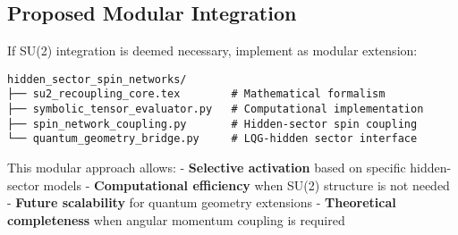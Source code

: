 \documentclass[12pt]{article}
\begin{document}
\subsection{Proposed Modular Integration}

If SU(2) integration is deemed necessary, implement as modular extension:

\begin{verbatim}
hidden_sector_spin_networks/
├── su2_recoupling_core.tex        # Mathematical formalism
├── symbolic_tensor_evaluator.py   # Computational implementation  
├── spin_network_coupling.py       # Hidden-sector spin coupling
└── quantum_geometry_bridge.py     # LQG-hidden sector interface
\end{verbatim}

This modular approach allows:
- \textbf{Selective activation} based on specific hidden-sector models
- \textbf{Computational efficiency} when SU(2) structure is not needed  
- \textbf{Future scalability} for quantum geometry extensions
- \textbf{Theoretical completeness} when angular momentum coupling is required



\end{document}
